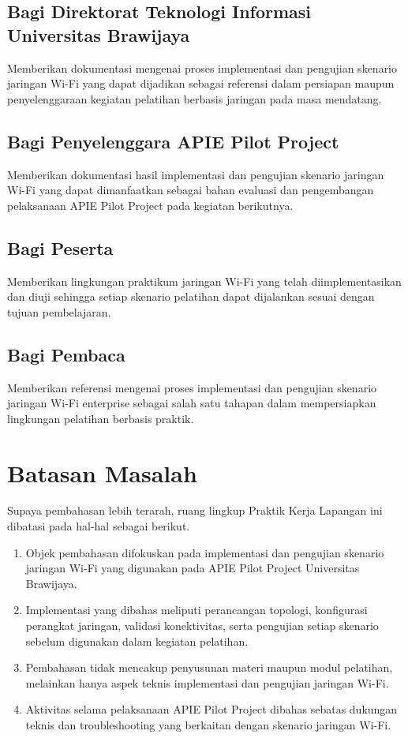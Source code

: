 \subsection{Bagi Direktorat Teknologi Informasi Universitas Brawijaya}
Memberikan dokumentasi mengenai proses implementasi dan pengujian skenario jaringan Wi-Fi yang dapat dijadikan sebagai referensi dalam persiapan maupun penyelenggaraan kegiatan pelatihan berbasis jaringan pada masa mendatang.

\subsection{Bagi Penyelenggara APIE Pilot Project}
Memberikan dokumentasi hasil implementasi dan pengujian skenario jaringan Wi-Fi yang dapat dimanfaatkan sebagai bahan evaluasi dan pengembangan pelaksanaan APIE Pilot Project pada kegiatan berikutnya.

\subsection{Bagi Peserta}
Memberikan lingkungan praktikum jaringan Wi-Fi yang telah diimplementasikan dan diuji sehingga setiap skenario pelatihan dapat dijalankan sesuai dengan tujuan pembelajaran.

\subsection{Bagi Pembaca}
Memberikan referensi mengenai proses implementasi dan pengujian skenario jaringan Wi-Fi enterprise sebagai salah satu tahapan dalam mempersiapkan lingkungan pelatihan berbasis praktik.

\section{Batasan Masalah}

Supaya pembahasan lebih terarah, ruang lingkup Praktik Kerja Lapangan ini dibatasi pada hal-hal sebagai berikut.

\begin{enumerate}[nosep]
\item Objek pembahasan difokuskan pada implementasi dan pengujian skenario jaringan Wi-Fi yang digunakan pada APIE Pilot Project Universitas Brawijaya.
\item Implementasi yang dibahas meliputi perancangan topologi, konfigurasi perangkat jaringan, validasi konektivitas, serta pengujian setiap skenario sebelum digunakan dalam kegiatan pelatihan.
\item Pembahasan tidak mencakup penyusunan materi maupun modul pelatihan, melainkan hanya aspek teknis implementasi dan pengujian jaringan Wi-Fi.
\item Aktivitas selama pelaksanaan APIE Pilot Project dibahas sebatas dukungan teknis dan troubleshooting yang berkaitan dengan skenario jaringan Wi-Fi.
\end{enumerate}
